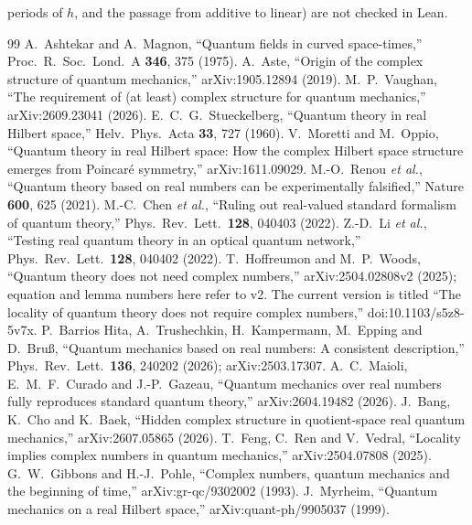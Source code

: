 \documentclass[11pt]{article}
\theoremstyle{remark}
\begin{document}
periods of $h$, and the passage from additive to linear) are not checked in Lean.

\begin{thebibliography}{99}
 A.~Ashtekar and A.~Magnon, ``Quantum fields in curved space-times,'' Proc.\ R.\ Soc.\ Lond.\ A \textbf{346}, 375 (1975).
 A.~Aste, ``Origin of the complex structure of quantum mechanics,'' arXiv:1905.12894 (2019).
 M.~P.~Vaughan, ``The requirement of (at least) complex structure for quantum mechanics,'' arXiv:2609.23041 (2026).
 E.~C.~G.~Stueckelberg, ``Quantum theory in real Hilbert space,'' Helv.\ Phys.\ Acta \textbf{33}, 727 (1960).
 V.~Moretti and M.~Oppio, ``Quantum theory in real Hilbert space: How the complex Hilbert space structure emerges from Poincar\'e symmetry,'' arXiv:1611.09029.
 M.-O.~Renou \emph{et al.}, ``Quantum theory based on real numbers can be experimentally falsified,'' Nature \textbf{600}, 625 (2021).
 M.-C.~Chen \emph{et al.}, ``Ruling out real-valued standard formalism of quantum theory,'' Phys.\ Rev.\ Lett.\ \textbf{128}, 040403 (2022).
 Z.-D.~Li \emph{et al.}, ``Testing real quantum theory in an optical quantum network,'' Phys.\ Rev.\ Lett.\ \textbf{128}, 040402 (2022).
 T.~Hoffreumon and M.~P.~Woods, ``Quantum theory does not need complex numbers,'' arXiv:2504.02808v2 (2025); equation and lemma numbers here refer to v2. The current version is titled ``The locality of quantum theory does not require complex numbers,'' doi:10.1103/s5z8-5v7x.
 P.~Barrios Hita, A.~Trushechkin, H.~Kampermann, M.~Epping and D.~Bru\ss, ``Quantum mechanics based on real numbers: A consistent description,'' Phys.\ Rev.\ Lett.\ \textbf{136}, 240202 (2026); arXiv:2503.17307.
 A.~C.~Maioli, E.~M.~F.~Curado and J.-P.~Gazeau, ``Quantum mechanics over real numbers fully reproduces standard quantum theory,'' arXiv:2604.19482 (2026).
 J.~Bang, K.~Cho and K.~Baek, ``Hidden complex structure in quotient-space real quantum mechanics,'' arXiv:2607.05865 (2026).
 T.~Feng, C.~Ren and V.~Vedral, ``Locality implies complex numbers in quantum mechanics,'' arXiv:2504.07808 (2025).
 G.~W.~Gibbons and H.-J.~Pohle, ``Complex numbers, quantum mechanics and the beginning of time,'' arXiv:gr-qc/9302002 (1993).
 J.~Myrheim, ``Quantum mechanics on a real Hilbert space,'' arXiv:quant-ph/9905037 (1999).

\end{thebibliography}
\end{document}
